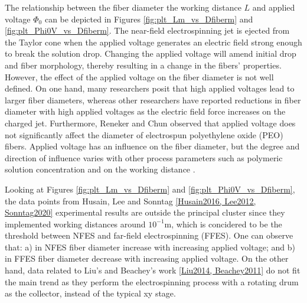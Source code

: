 The relationship between the fiber diameter the working distance $L$ and applied voltage $\Phi_0$ can be depicted in Figures \ref{fig:plt_Lm_vs_Dfiberm} and \ref{fig:plt_Phi0V_vs_Dfiberm}. The near-field electrospinning jet is ejected from the Taylor cone when the applied voltage generates an electric field strong enough to break the solution drop. Changing the applied voltage will amend initial drop and fiber morphology, thereby resulting in a change in the fibers' properties. However, the effect of the applied voltage on the fiber diameter is not well defined. On one hand, many researchers posit that high applied voltages lead to larger fiber diameters, whereas other researchers have reported reductions in fiber diameter with high applied voltages as the electric field force increases on the charged jet. \cite{Zhang2005} Furthermore, Reneker and Chun observed that applied voltage does not significantly affect the diameter of electrospun polyethylene oxide (PEO) fibers. \cite{Reneker1996} Applied voltage has an influence on the fiber diameter, but the degree and direction of influence varies with other process parameters such as polymeric solution concentration and on the working distance \cite{Yordem2008, Chang2016}.

Looking at Figures \ref{fig:plt_Lm_vs_Dfiberm} and \ref{fig:plt_Phi0V_vs_Dfiberm}, the data points from Husain, Lee and Sonntag \ref{Husain2016, Lee2012, Sonntag2020} experimental results are outside the principal cluster since they implemented working distances around $10^{-1} \textrm{m}$, which is concidered to be the threshold between NFES and far-field electrospinning (FFES). One can observe that: a) in NFES fiber diameter increase with increasing applied voltage; and b) in FFES fiber diameter decrease with increasing applied voltage. On the other hand, data related to Liu's and Beachey's work \ref{Liu2014, Beachey2011} do not fit the main trend as they perform the electrospinning process with a rotating drum as the collector, instead of the typical xy stage.

